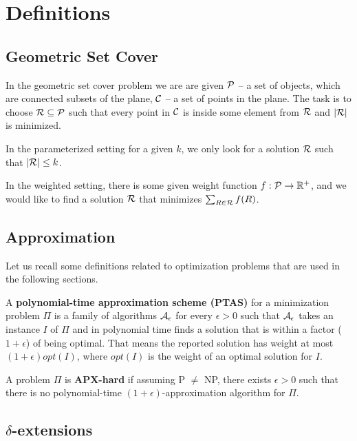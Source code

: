 \chapter{Definitions}

\section{Geometric Set Cover}

In the geometric set cover problem we are are given
$\mathcal{P}$ -- a set of objects, which are connected
subsets of the plane, $\mathcal{C}$ -- a set of points in the plane.
The task is to choose $\mathcal{R} \subseteq \mathcal{P}$ such that
every point in $\mathcal{C}$ is inside some element from $\mathcal{R}$
and $|\mathcal{R}|$ is minimized.

In the parameterized setting for a given $k$,
we only look for a solution $\mathcal{R}$ such that $|\mathcal{R}| \le k$.


In the weighted setting, there is some given weight function
$f : \mathcal{P} \rightarrow \mathbb{R^+}$,
and we would like to find a solution $\mathcal{R}$
that minimizes $\sum_{R \in \mathcal{R}} f(R)$.

\section{Approximation}

Let us recall some definitions related to optimization problems
that are used in the following sections.

\begin{defi}
A \textbf{polynomial-time approximation scheme (PTAS)}
for a minimization problem $\Pi$
is a family of algorithms $\cal{A}_\epsilon$ for
every $\epsilon > 0$
such that $\cal{A}_\epsilon$ takes an instance $I$ of $\Pi$
and in polynomial time
finds a solution that is within a factor
($1+\epsilon$) of being optimal.
That means the reported solution has weight at most
$(1+\epsilon)opt(I)$, where $opt(I)$ is the weight
of an optimal solution for $I$.
\end{defi}

\begin{defi}
A problem $\Pi$ is \textbf{APX-hard} if assuming P $\neq$ NP,
there exists $\epsilon > 0$
such that there is no polynomial-time $(1+\epsilon)$-approximation algorithm
for $\Pi$.
\end{defi}

\section{$\delta$-extensions}

